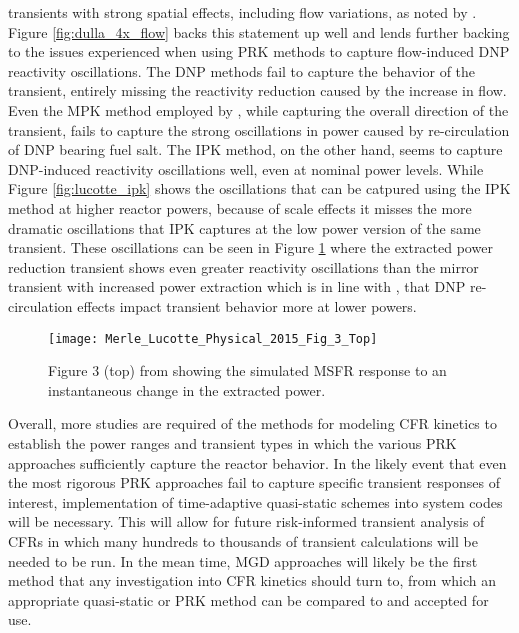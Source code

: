 \documentclass[review]{elsarticle}
\begin{document}
transients with strong spatial effects, including flow variations, as noted by 
\cite{dulla_models_2005}. Figure \ref{fig:dulla_4x_flow} backs this statement
up well and lends further backing to the issues experienced when using
 PRK methods 
to capture flow-induced DNP reactivity oscillations. The DNP methods fail
to capture the behavior of the transient, entirely missing the reactivity
reduction caused by the increase in flow. Even the MPK method employed by
\cite{dulla_models_2005}, while capturing the overall direction of the
transient, fails to capture the strong oscillations in power caused by
re-circulation of DNP bearing fuel salt. The IPK method, on the other hand,
seems to capture DNP-induced reactivity oscillations well, even at nominal
power levels. While Figure \ref{fig:lucotte_ipk} shows the oscillations that
can be catpured using the
IPK method at higher reactor powers, because of scale effects
it misses the more dramatic oscillations that IPK captures at the low power
version of the same transient. These oscillations can be seen in Figure
\ref{fig:lucotte_ipk_reac} where the extracted power reduction transient shows
even greater reactivity oscillations than the mirror transient with increased
power extraction which is in line with
\cite{zanetti_development_2016}, that DNP re-circulation effects impact
transient behavior more at lower powers.

\begin{figure}[H]
   \centering
   \texttt{[image: Merle\_Lucotte\_Physical\_2015\_Fig\_3\_Top]}
   \caption{Figure 3 (top) from \cite{merle-lucotte_physical_2015} showing the simulated
   MSFR response to an instantaneous change in the extracted power.} 
   \label{fig:lucotte_ipk_reac}
\end{figure}

\par Overall, more studies are required of the methods for modeling CFR
kinetics to establish the power ranges and transient
types in which the various PRK approaches sufficiently capture the reactor behavior.
In the likely event that even the most rigorous PRK approaches fail to capture
specific transient responses of interest, implementation of time-adaptive
quasi-static schemes into system codes will be necessary. This will allow for
 future
risk-informed transient analysis of CFRs in which many hundreds to thousands
of transient calculations will be needed to be run. In the mean time, MGD
approaches will likely be the first method that any investigation into CFR kinetics
should turn to, from which an appropriate quasi-static or PRK method can be compared to and accepted for use.
\end{document}
